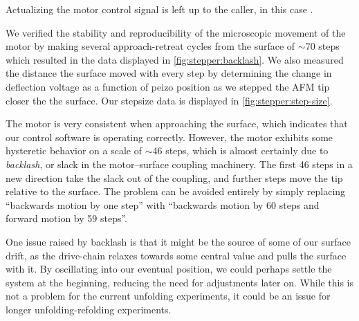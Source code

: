 Actualizing the motor control signal is left up to the caller, in this
case \pyafm.

We verified the stability and reproducibility of the microscopic
movement of the motor by making several approach-retreat cycles from
the surface of $\sim$70 steps which resulted in the data displayed in
\cref{fig:stepper:backlash}.  We also measured the distance the
surface moved with every step by determining the change in deflection
voltage as a function of peizo position as we stepped the AFM tip
closer the the surface.  Our stepsize data is displayed in
\cref{fig:stepper:step-size}.

The motor is very consistent when approaching the surface, which
indicates that our control software is operating correctly.  However,
the motor exhibits some hysteretic behavior on a scale of $\sim$46
steps, which is almost certainly due to \emph{backlash}, or slack in
the motor--surface coupling machinery.  The first 46 steps in a new
direction take the slack out of the coupling, and further steps move
the tip relative to the surface.  The problem can be avoided entirely
by simply replacing ``backwards motion by one step'' with ``backwards
motion by 60 steps and forward motion by 59 steps''.

One issue raised by backlash is that it might be the source of some of
our surface drift, as the drive-chain relaxes towards some central
value and pulls the surface with it.  By oscillating into our eventual
position, we could perhaps settle the system at the beginning,
reducing the need for adjustments later on.  While this is not a
problem for the current unfolding experiments, it could be an issue
for longer unfolding-refolding experiments.


